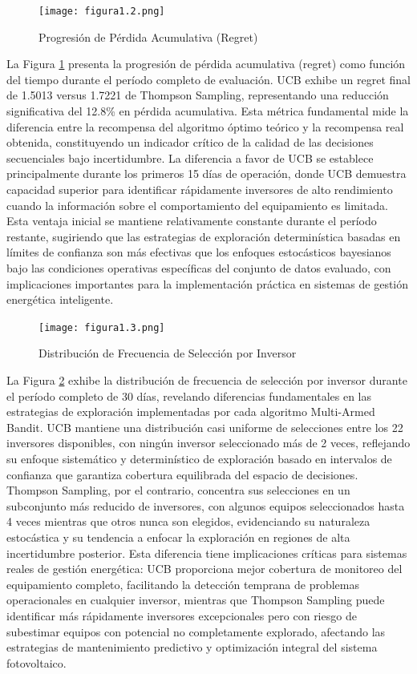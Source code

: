 \documentclass[conference]{IEEEtran}
\begin{document}
\begin{figure}[H]
\centering
\texttt{[image: figura1.2.png]}
\caption{Progresión de Pérdida Acumulativa (Regret)}
\label{fig:1.2}
\end{figure}

La Figura \ref{fig:1.2} presenta la progresión de pérdida acumulativa (regret) como función del tiempo durante el período completo de evaluación. UCB exhibe un regret final de 1.5013 versus 1.7221 de Thompson Sampling, representando una reducción significativa del 12.8\% en pérdida acumulativa. Esta métrica fundamental mide la diferencia entre la recompensa del algoritmo óptimo teórico y la recompensa real obtenida, constituyendo un indicador crítico de la calidad de las decisiones secuenciales bajo incertidumbre. La diferencia a favor de UCB se establece principalmente durante los primeros 15 días de operación, donde UCB demuestra capacidad superior para identificar rápidamente inversores de alto rendimiento cuando la información sobre el comportamiento del equipamiento es limitada. Esta ventaja inicial se mantiene relativamente constante durante el período restante, sugiriendo que las estrategias de exploración determinística basadas en límites de confianza son más efectivas que los enfoques estocásticos bayesianos bajo las condiciones operativas específicas del conjunto de datos evaluado, con implicaciones importantes para la implementación práctica en sistemas de gestión energética inteligente.

\begin{figure}[H]
\centering
\texttt{[image: figura1.3.png]}
\caption{Distribución de Frecuencia de Selección por Inversor}
\label{fig:1.3}
\end{figure}

La Figura \ref{fig:1.3} exhibe la distribución de frecuencia de selección por inversor durante el período completo de 30 días, revelando diferencias fundamentales en las estrategias de exploración implementadas por cada algoritmo Multi-Armed Bandit. UCB mantiene una distribución casi uniforme de selecciones entre los 22 inversores disponibles, con ningún inversor seleccionado más de 2 veces, reflejando su enfoque sistemático y determinístico de exploración basado en intervalos de confianza que garantiza cobertura equilibrada del espacio de decisiones. Thompson Sampling, por el contrario, concentra sus selecciones en un subconjunto más reducido de inversores, con algunos equipos seleccionados hasta 4 veces mientras que otros nunca son elegidos, evidenciando su naturaleza estocástica y su tendencia a enfocar la exploración en regiones de alta incertidumbre posterior. Esta diferencia tiene implicaciones críticas para sistemas reales de gestión energética: UCB proporciona mejor cobertura de monitoreo del equipamiento completo, facilitando la detección temprana de problemas operacionales en cualquier inversor, mientras que Thompson Sampling puede identificar más rápidamente inversores excepcionales pero con riesgo de subestimar equipos con potencial no completamente explorado, afectando las estrategias de mantenimiento predictivo y optimización integral del sistema fotovoltaico.
\end{document}
